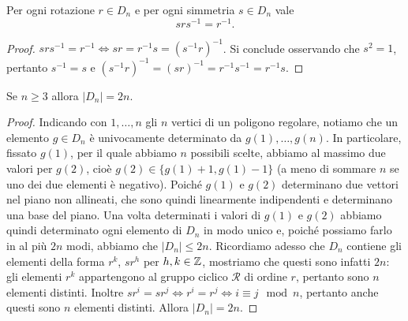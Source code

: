\documentclass[11pt]{scrartcl}
\begin{document}
\begin{lemma}
    \label{lemma1.0}
    Per ogni rotazione $r \in D_n$ e per ogni simmetria $s \in D_n$ vale
    \[srs^{-1} = r^{-1}.\]
\end{lemma}

\begin{proof}
    $srs^{-1} = r^{-1} \iff sr = r^{-1}s = (s^{-1}r)^{-1}$. Si conclude
    osservando che $s^2 = 1$, pertanto $s^{-1} = s$ e $(s^{-1}r)^{-1} =
    (sr)^{-1} = r^{-1}s^{-1} = r^{-1}s$.
\end{proof}

\begin{proposition}
    \label{prop2.0}
    Se $n \geq 3$ allora $|D_n| = 2n$.
\end{proposition}

\begin{proof}
    Indicando con $1, \dots, n$ gli $n$ vertici di un poligono regolare, notiamo
    che un elemento $g \in D_n$ è univocamente determinato da $g(1), \dots, g(n)$.
    In particolare, fissato $g(1)$, per il quale abbiamo $n$ possibili scelte,
    abbiamo al massimo due valori per $g(2)$, cioè $g(2) \in \{g(1) + 1, g(1) - 1\}$
    (a meno di sommare $n$ se uno dei due elementi è negativo). Poiché $g(1)$
    e $g(2)$ determinano due vettori nel piano non allineati, che sono quindi
    linearmente indipendenti e determinano una base del piano. Una volta 
    determinati i valori di $g(1)$ e $g(2)$ abbiamo quindi determinato ogni
    elemento di $D_n$ in modo unico e, poiché possiamo farlo in al più $2n$ modi, 
    abbiamo che $|D_n| \leq 2n$. Ricordiamo adesso che $D_n$ contiene gli elementi
    della forma $r^k$, $sr^h$ per $h, k \in \mathbb Z$, mostriamo che questi sono 
    infatti $2n$: gli elementi $r^k$ appartengono al gruppo ciclico $\mathcal{R}$
    di ordine $r$, pertanto sono $n$ elementi distinti. Inoltre $sr^i = sr^j
    \iff r^i = r^j\iff i \equiv j \mod n$, pertanto anche questi sono $n$
    elementi distinti. Allora $|D_n| = 2n$.
\end{proof}
\end{document}
